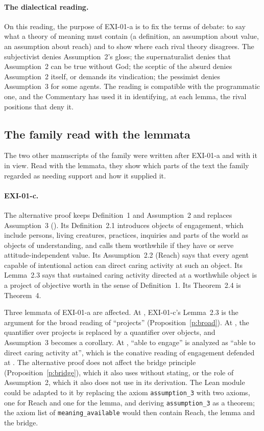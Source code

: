 \paragraph{The dialectical reading.} On this reading, the purpose of EXI-01-a is to fix the terms of debate: to say what a theory of meaning must contain (a definition, an assumption about value, an assumption about reach) and to show where each rival theory disagrees. The subjectivist denies Assumption~2's gloss; the supernaturalist denies that Assumption~2 can be true without God; the sceptic of the absurd denies Assumption~2 itself, or demands its vindication; the pessimist denies Assumption~3 for some agents. The reading is compatible with the programmatic one, and the Commentary has used it in identifying, at each lemma, the rival positions that deny it.

\subsection{The family read with the lemmata}\label{s:family}

The two other manuscripts of the family were written after EXI-01-a and with it in view. Read with the lemmata, they show which parts of the text the family regarded as needing support and how it supplied it.

\paragraph{EXI-01-c.} The alternative proof keeps Definition~1 and Assumption~2 and replaces Assumption~3 (). Its Definition~2.1 introduces objects of engagement, which include persons, living creatures, practices, inquiries and parts of the world as objects of understanding, and calls them worthwhile if they have or serve attitude-independent value. Its Assumption~2.2 (Reach) says that every agent capable of intentional action can direct caring activity at such an object. Its Lemma~2.3 says that sustained caring activity directed at a worthwhile object is a project of objective worth in the sense of Definition~1. Its Theorem~2.4 is Theorem~4.

Three lemmata of EXI-01-a are affected. At , EXI-01-c's Lemma~2.3 is the argument for the broad reading of \enquote{projects} (Proposition~\ref{p:broad}). At , the quantifier over projects is replaced by a quantifier over objects, and Assumption~3 becomes a corollary. At , \enquote{able to engage} is analyzed as \enquote{able to direct caring activity at}, which is the conative reading of engagement defended at . The alternative proof does not affect the bridge principle (Proposition~\ref{p:bridge}), which it also uses without stating, or the role of Assumption~2, which it also does not use in its derivation. The Lean module could be adapted to it by replacing the axiom \texttt{assumption\_3} with two axioms, one for Reach and one for the lemma, and deriving \texttt{assumption\_3} as a theorem; the axiom list of \texttt{meaning\_available} would then contain Reach, the lemma and the bridge.

